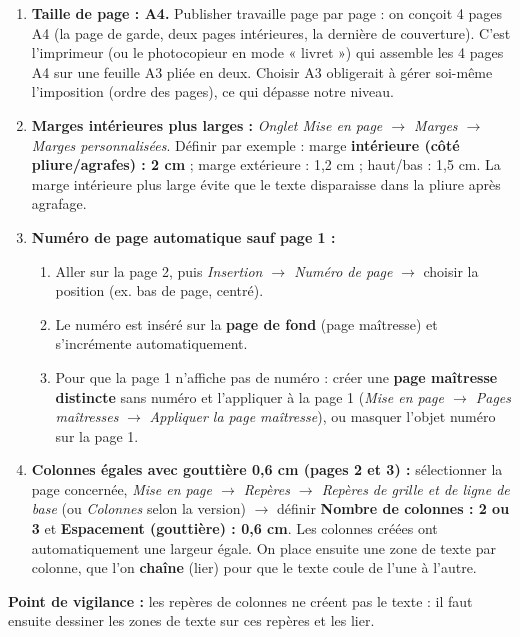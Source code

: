 \documentclass[11pt]{article}
\begin{document}
\begin{corrige}
\begin{enumerate}
    \item \textbf{Taille de page : A4.} Publisher travaille page par page : on conçoit 4 pages A4 (la page de garde, deux pages intérieures, la dernière de couverture). C'est l'imprimeur (ou le photocopieur en mode « livret ») qui assemble les 4 pages A4 sur une feuille A3 pliée en deux. Choisir A3 obligerait à gérer soi-même l'imposition (ordre des pages), ce qui dépasse notre niveau.
    \item \textbf{Marges intérieures plus larges :} \textit{Onglet Mise en page $\rightarrow$ Marges $\rightarrow$ Marges personnalisées}. Définir par exemple : marge \textbf{intérieure (côté pliure/agrafes) : 2 cm} ; marge extérieure : 1,2 cm ; haut/bas : 1,5 cm. La marge intérieure plus large évite que le texte disparaisse dans la pliure après agrafage.
    \item \textbf{Numéro de page automatique sauf page 1 :}
    \begin{enumerate}
        \item Aller sur la page 2, puis \textit{Insertion $\rightarrow$ Numéro de page} $\rightarrow$ choisir la position (ex. bas de page, centré).
        \item Le numéro est inséré sur la \textbf{page de fond} (page maîtresse) et s'incrémente automatiquement.
        \item Pour que la page 1 n'affiche pas de numéro : créer une \textbf{page maîtresse distincte} sans numéro et l'appliquer à la page 1 (\textit{Mise en page $\rightarrow$ Pages maîtresses} $\rightarrow$ \textit{Appliquer la page maîtresse}), ou masquer l'objet numéro sur la page 1.
    \end{enumerate}
    \item \textbf{Colonnes égales avec gouttière 0,6 cm (pages 2 et 3) :} sélectionner la page concernée, \textit{Mise en page $\rightarrow$ Repères $\rightarrow$ Repères de grille et de ligne de base} (ou \textit{Colonnes} selon la version) $\rightarrow$ définir \textbf{Nombre de colonnes : 2 ou 3} et \textbf{Espacement (gouttière) : 0,6 cm}. Les colonnes créées ont automatiquement une largeur égale. On place ensuite une zone de texte par colonne, que l'on \textbf{chaîne} (lier) pour que le texte coule de l'une à l'autre.
\end{enumerate}

\textbf{Point de vigilance :} les repères de colonnes ne créent pas le texte : il faut ensuite dessiner les zones de texte sur ces repères et les lier.
\end{corrige}
\end{document}
